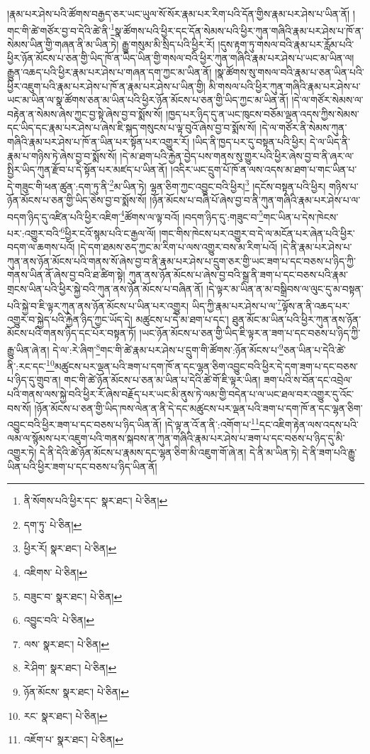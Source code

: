 །རྣམ་པར་ཤེས་པའི་ཚོགས་བརྒྱད་ཅར་ཡང་ཡུལ་སོ་སོར་རྣམ་པར་རིག་པའི་དོན་གྱིས་རྣམ་པར་ཤེས་པ་ཡིན་ནོ། །གང་གི་ཚེ་གཙོར་བྱ་བ་དེའི་ཚེ་ནི་\footnote{ནི་སོགས་པའི་ཕྱིར་དང་  སྣར་ཐང་།  པེ་ཅིན། }སྣ་ཚོགས་པའི་ཕྱིར་དང་དོན་སེམས་པའི་ཕྱིར་ཀུན་གཞིའི་རྣམ་པར་ཤེས་པ་ཁོ་ན་སེམས་ཡིན་གྱི་གཞན་ནི་མ་ཡིན་ཏེ། རྒྱུ་གསུམ་མི་སྲིད་པའི་ཕྱིར་རོ། །དུས་རྟག་ཏུ་གསལ་བའི་རྣམ་པར་རློམ་པའི་ཕྱིར་ཉོན་མོངས་པ་ཅན་གྱི་ཡིད་ཁོ་ན་ཡིད་ཡིན་གྱི་གསལ་བའི་ཕྱིར་ཀུན་གཞིའི་རྣམ་པར་ཤེས་པ་ཡང་མ་ཡིན་ལ། རྒྱུན་འཆད་པའི་ཕྱིར་རྣམ་པར་ཤེས་པ་གཞན་དག་ཀྱང་མ་ཡིན་ནོ། །སྣ་ཚོགས་སུ་གསལ་བའི་རྣམ་པ་ཅན་ཡིན་པའི་ཕྱིར་འཇུག་པའི་རྣམ་པར་ཤེས་པ་ཁོ་ན་རྣམ་པར་ཤེས་པ་ཡིན་གྱི། མི་གསལ་པའི་ཕྱིར་ཀུན་གཞིའི་རྣམ་པར་ཤེས་པ་ཡང་མ་ཡིན་ལ་སྣ་ཚོགས་ཅན་མ་ཡིན་པའི་ཕྱིར་ཉོན་མོངས་པ་ཅན་གྱི་ཡིད་ཀྱང་མ་ཡིན་ནོ། །དེ་ལ་གཙོར་སེམས་ལ་བརྟེན་ན་སེམས་ཞེས་ཀྱང་བྱ་སྟེ་ཞེས་བྱ་བ་སྨོས་སོ། །ཁྱད་པར་ཉིད་དུ་ན་ཡང་ཁུངས་བཅོམ་ལྡན་འདས་ཀྱིས་སེམས་དང་ཡིད་དང་རྣམ་པར་ཤེས་པ་ཞེས་ཇི་སྐད་གསུངས་པ་ལྟ་བུའོ་ཞེས་བྱ་བ་སྨོས་སོ། །དེ་ལ་གཙོར་ནི་སེམས་ཀུན་གཞིའི་རྣམ་པར་ཤེས་པ་ཁོ་ན་ཡིན་པར་སྟོན་པར་འགྱུར་རོ། །ཡིད་ནི་ཁྱད་པར་དུ་བསྟན་པའི་ཕྱིར། དེ་ལ་ཡིད་ནི་རྣམ་པ་གཉིས་ཏེ་ཞེས་བྱ་བ་སྨོས་སོ། །དེ་མ་ཐག་པའི་རྐྱེན་བྱེད་པས་གནས་སུ་གྱུར་པའི་ཕྱིར་ཞེས་བྱ་བ་ནི་ཞར་ལ་སྤྱིར་ཡིད་ཀུན་རྫོབ་པ་དེ་སྟོན་པར་མཛད་པ་ཡིན་ནོ། །འདིར་ཡང་དྲུག་པོ་ཁོ་ན་ལས་འདས་མ་ཐག་པ་གང་ཡིན་པ་དེ་གཟུང་གི་ཕན་ཚུན་:དག་ཏུ་ནི་\footnote{དག་ཏུ་  པེ་ཅིན། }མ་ཡིན་ཏེ། ལྷན་ཅིག་ཀྱང་འབྱུང་བའི་ཕྱིར།\footnote{ཕྱིར་རོ།  སྣར་ཐང་།  པེ་ཅིན། } །དངོས་བསྟན་པའི་ཕྱིར། གཉིས་པ་ཉོན་མོངས་པ་ཅན་གྱི་ཡིད་ཅེས་བྱ་བ་སྨོས་སོ། །ཉོན་མོངས་པ་བཞི་པོ་ཞེས་བྱ་བ་ནི་ཀུན་གཞིའི་རྣམ་པར་ཤེས་པ་ལ་བདག་ཉིད་དུ་འཛིན་པའི་ཕྱིར་འཇིག་\footnote{འཇིགས་  པེ་ཅིན། }ཚོགས་ལ་ལྟ་བའོ། །བདག་ཉིད་དུ་:གཟུང་བ་\footnote{བཟུང་བ་  སྣར་ཐང་།  པེ་ཅིན། }གང་ཡིན་པ་དེས་ཁེངས་པར་:འགྱུར་བའི་\footnote{འབྱུང་བའི་  པེ་ཅིན། }ཕྱིར་ངའོ་སྙམ་པའི་ང་རྒྱལ་ལོ། །གང་གིས་ཁེངས་པར་འགྱུར་བ་དེ་ལ་མངོན་པར་ཞེན་པའི་ཕྱིར་བདག་ལ་ཆགས་པའོ། །དེ་དག་ཐམས་ཅད་ཀྱང་མ་རིག་པ་ལས་འགྱུར་བས་མ་རིག་པའོ། །དེ་ནི་རྣམ་པར་ཤེས་པ་ཀུན་ནས་ཉོན་མོངས་པའི་གནས་སོ་ཞེས་བྱ་བ་ནི་རྣམ་པར་ཤེས་པ་དྲུག་ཅར་གྱི་ཡང་ཟག་པ་དང་བཅས་པ་ཉིད་ཀྱི་གནས་ཡིན་ནོ་ཞེས་བྱ་བའི་ཐ་ཚིག་སྟེ། ཀུན་ནས་ཉོན་མོངས་པ་ཞེས་བྱ་བའི་སྒྲ་ནི་ཟག་པ་དང་བཅས་པའི་རྣམ་གྲངས་ཡིན་པའི་ཕྱིར་སྐྱེ་བའི་ཀུན་ནས་ཉོན་མོངས་པ་བཞིན་ནོ། །དེ་ལྟར་མ་ཡིན་ན་མ་བསྒྲིབས་ལ་ལུང་དུ་མ་བསྟན་པའི་སྐྱེ་བ་ཇི་ལྟར་ཀུན་ནས་ཉོན་མོངས་པ་ཡིན་པར་འགྱུར། ཡིད་ཀྱི་རྣམ་པར་ཤེས་པ་ལ་\footnote{ལས་  སྣར་ཐང་།  པེ་ཅིན། }ལྟོས་ན་ནི་འཆད་པར་འགྱུར་བ་སྐྱེད་པའི་རྐྱེན་ཉིད་ཀྱང་ཡོད་དེ། མཚུངས་པ་དེ་མ་ཐག་པ་དང་། ཐུན་མོང་མ་ཡིན་པའི་ཕྱིར་ཀུན་ནས་ཉོན་མོངས་པའི་གནས་ཉིད་དང་པོར་བསྟན་ཏོ། །ཡང་ཉོན་མོངས་པ་ཅན་གྱི་ཡིད་ཇི་ལྟར་ན་ཟག་པ་དང་བཅས་པ་ཉིད་ཀྱི་རྒྱུ་ཡིན་ཞེ་ན། དེ་ལ་:རེ་ཞིག་\footnote{རེ་ཤིག་  སྣར་ཐང་།  པེ་ཅིན། }གང་གི་ཚེ་རྣམ་པར་ཤེས་པ་དྲུག་གི་ཚོགས་:ཉོན་མོངས་པ་\footnote{ཉོན་མོངས་  སྣར་ཐང་།  པེ་ཅིན། }ཅན་ཡིན་པ་དེའི་ཚེ་ནི་:རང་དང་\footnote{རང་  སྣར་ཐང་།  པེ་ཅིན། }མཚུངས་པར་ལྡན་པའི་ཟག་པ་དག་ཁོ་ན་དང་ལྷན་ཅིག་འབྱུང་བའི་ཕྱིར་དེ་དག་ཟག་པ་དང་བཅས་པ་ཉིད་དུ་གྲུབ་ན། གང་གི་ཚེ་ཉོན་མོངས་པ་ཅན་མ་ཡིན་པ་དེའི་ཚེ་གོ་ཇི་ལྟར་ཡིན། ཟག་པའི་ས་བོན་དང་འབྲེལ་པའི་གནས་ལས་སྐྱེ་བའི་ཕྱིར་རོ་ཞེས་བརྗོད་པར་ཡང་མི་ནུས་ཏེ་ལམ་གྱི་བདེན་པ་ལ་ཡང་ཐལ་བར་འགྱུར་དུ་འོང་བས་སོ། །ཉོན་མོངས་པ་ཅན་གྱི་ཡིད་ཁས་ལེན་ན་ནི་དེ་དང་མཚུངས་པར་ལྡན་པའི་ཟག་པ་དག་ཁོ་ན་དང་ལྷན་ཅིག་འབྱུང་བའི་ཕྱིར་ཟག་པ་དང་བཅས་པ་ཉིད་ཡིན་ནོ། །དེ་ལྟ་ན་འོ་ན་ནི་:འགོག་པ་\footnote{འཇོག་པ་  སྣར་ཐང་།  པེ་ཅིན། }དང་འཇིག་རྟེན་ལས་འདས་པའི་ལམ་ལ་སྙོམས་པར་འཇུག་པའི་གནས་སྐབས་ན་ཀུན་གཞིའི་རྣམ་པར་ཤེས་པ་ཟག་པ་དང་བཅས་པ་ཉིད་དུ་མི་འགྱུར་ཏེ། དེ་ནི་དེའི་ཚེ་ཉོན་མོངས་པ་རྣམས་དང་ལྷན་ཅིག་མི་འཇུག་གོ་ཞེ་ན། དེ་ནི་མ་ཡིན་ཏེ། དེ་ནི་ཟག་པའི་རྒྱུ་ཡིན་པའི་ཕྱིར་ཟག་པ་དང་བཅས་པ་ཉིད་ཡིན་ནོ། 
